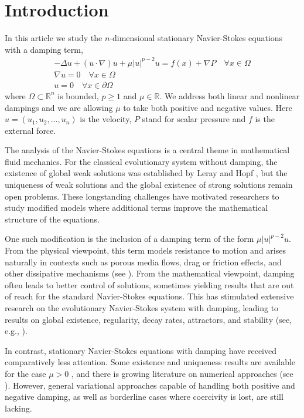 \documentclass[reqno]{amsart}
\begin{document}
\section{Introduction}

In this article we study  the $n$-dimensional  stationary Navier-Stokes equations
with a damping term,
\begin{equation}\label{eq1}
 \begin{gathered}
 -\Delta u+ (u \cdot \nabla)u  +\mu |u|^{p-2}u = f(x) + \nabla P  \quad
   \forall x\in \Omega\\
 \nabla  u=0  \quad  \forall x\in \Omega \\
  u=0  \quad   \forall x\in \partial\Omega
\end{gathered}
\end{equation}
where \(\Omega \subset \mathbb{R} ^n\) is  bounded,  $p\geq 1$ and
$\mu \in \mathbb{R}$.  We address both  linear and nonlinear dampings
and we are allowing $\mu$ to take both positive and negative values.
Here \(u  = (u_1, u_2,\dots, u_n)\) is the velocity, \(P\) stand for scalar pressure
and \(f\) is the  external force.

The analysis of the Navier-Stokes equations is a central theme in mathematical fluid
mechanics. For the classical evolutionary system without damping, the existence of
global weak solutions was established by Leray \cite{JL} and Hopf \cite{EH}, but the
uniqueness of weak solutions and the global existence of strong solutions remain open
problems. These longstanding challenges have motivated researchers to study modified
models where additional terms improve the mathematical structure of the equations.

One such modification is the inclusion of a damping term of the form $\mu |u|^{p-2}u$.
From the physical viewpoint, this term models resistance to motion and arises naturally
in contexts such as porous media flows, drag or friction effects, and other dissipative
mechanisms (see \cite{LHS, RTE}). From the mathematical viewpoint, damping often
leads to better control of solutions, sometimes yielding results that are out of reach
for the standard Navier-Stokes equations. This has stimulated extensive research on the
evolutionary Navier-Stokes system with damping, leading to results on global existence,
regularity, decay rates, attractors, and stability (see, e.g.,
\cite{XC, YJX, ZHJ, ZHM, XLS,ZJZ, YZ, ZZC}).

In contrast,  stationary Navier-Stokes equations with damping have received comparatively
less attention. Some existence and uniqueness results are available for the case
$\mu > 0$ \cite{WLW}, and there is growing literature on numerical approaches
(see \cite{ZLD, LML, HQL, HQY, ZBS}). However, general variational approaches capable
of handling both positive and negative damping, as well as borderline cases where
coercivity is lost, are still lacking.
\end{document}
